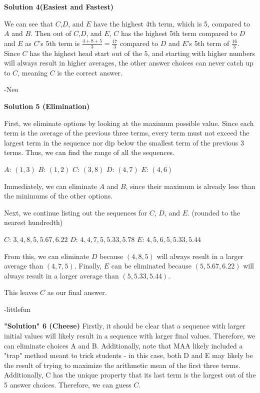 \begin{enumerate}
 



\textbf{Solution 4(Easiest and Fastest)}

We can see that $C$,$D$, and $E$ have the highest 4th term, which is 5, compared to $A$ and $B$. Then out of $C$,$D$, and $E$, $C$ has the highest 5th term compared to $D$ and $E$ as $C$'s 5th term is $\frac{4+8+5}{3}=\frac{17}{3}$ compared to $D$ and $E$'s 5th term of $\frac{16}{3}$. Since $C$ has the highest head start out of the $5$, and starting with higher numbers will always result in higher averages, the other answer choices can never catch up to $C$, meaning $\boxed{C}$ is the correct answer. 

 -Neo

 



\textbf{Solution 5 (Elimination)}

First, we eliminate options by looking at the maximum possible value. Since each term is the average of the previous three terms, every term must not exceed the largest term in the sequence nor dip below the smallest term of the previous 3 terms. Thus, we can find the range of all the sequences.

 $A$: $(1, 3)$
$B$: $(1, 2)$
$C$: $(3, 8)$
$D$: $(4, 7)$
$E$: $(4, 6)$

 Immediately, we can eliminate $A$ and $B$, since their maximum is already less than the minimums of the other options.

 Next, we continue listing out the sequences for $C$, $D$, and $E$. (rounded to the nearest hundredth)

 $C$: $3, 4, 8, 5, 5.67, 6.22$
$D$: $4, 4, 7, 5, 5.33, 5.78$
$E$: $4, 5, 6, 5, 5.33, 5.44$

 From this, we can eliminate $D$ because $(4, 8, 5)$ will always result in a larger average than $(4, 7, 5)$. Finally, $E$ can be eliminated because $(5, 5.67, 6.22)$ will always result in a larger average than $(5, 5.33, 5.44)$.

 This leaves $\boxed{C}$ as our final answer.

 -littlefun

 \textbf{"Solution" 6 (Cheese)} Firstly, it should be clear that a sequence with larger initial values will likely result in a sequence with larger final values. Therefore, we can eliminate choices A and B. Additionally, note that MAA likely included a "trap" method meant to trick students - in this case, both D and E may likely be the result of trying to maximize the arithmetic mean of the first three terms. Additionally, C has the unique property that its last term is the largest out of the 5 answer choices. Therefore, we can guess $\boxed{C}$.


\end{enumerate}

